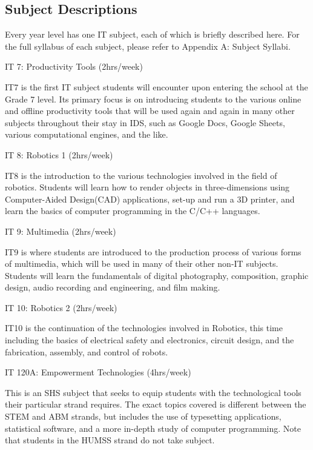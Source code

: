 \subsection{Subject Descriptions}
Every year level has one IT subject, each of which is briefly described here. For the full syllabus of each subject, please refer to Appendix A: Subject Syllabi.

\begin{subject}
IT 7: Productivity Tools
\hfill
(2hrs/week)
\end{subject}
IT7 is the first IT subject students will encounter upon entering the school at the Grade 7 level. Its primary focus is on introducing students to the various online and offline productivity tools that will be used again and again in many other subjects throughout their stay in IDS, such as Google Docs, Google Sheets, various computational engines, and the like. 

\begin{subject} IT 8: Robotics 1
\hfill
(2hrs/week)
\end{subject}
IT8 is the introduction to the various technologies involved in the field of robotics. Students will learn how to render objects in three-dimensions using Computer-Aided Design(CAD) applications, set-up and run a 3D printer, and learn the basics of computer programming in the C/C++ languages.

\begin{subject} IT 9: Multimedia
\hfill
(2hrs/week)
\end{subject}
IT9 is where students are introduced to the production process of various forms of multimedia, which will be used in many of their other non-IT subjects. Students will learn the fundamentals of digital photography, composition, graphic design, audio recording and engineering, and film making.

\begin{subject} IT 10: Robotics 2
\hfill
(2hrs/week)
\end{subject}
IT10 is the continuation of the technologies involved in Robotics, this time including the basics of electrical safety and electronics, circuit design, and the fabrication, assembly, and control of robots. 

\begin{subject} IT 120A: Empowerment Technologies
\hfill
(4hrs/week)
\end{subject}
This is an SHS subject that seeks to equip students with the technological tools their particular strand requires. The exact topics covered is different between the STEM and ABM strands, but includes the use of typesetting applications, statistical software, and a more in-depth study of computer programming. Note that students in the HUMSS strand do not take subject.

